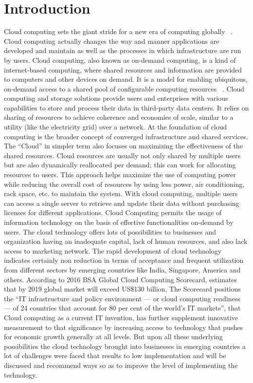 \documentclass[conference]{IEEEtran}
\begin{document}
\section{Introduction}
Cloud computing sets the giant stride for a new era of
computing globally ~\cite{1}. Cloud computing actually changes the
way and manner applications are developed and maintain as
well as the processes in which infrastructure are run by users.
Cloud computing, also known as on-demand computing, is a
kind of internet-based computing, where shared resources and
information are provided to computers and other devices on demand. It is a model for enabling ubiquitous, on-demand
access to a shared pool of configurable computing resources
~\cite{2}. Cloud computing and storage solutions provide users and
enterprises with various capabilities to store and process their
data in third-party data centers. It relies on sharing of resources
to achieve coherence and economies of scale, similar to a
utility (like the electricity grid) over a network. At the
foundation of cloud computing is the broader concept of
converged infrastructure and shared services. The “Cloud” in
simpler term also focuses on maximizing the effectiveness of
the shared resources. Cloud resources are usually not only
shared by multiple users but are also dynamically reallocated
per demand; this can work for allocating resources to users.
This approach helps maximize the use of computing power
while reducing the overall cost of resources by using less
power, air conditioning, rack space, etc. to maintain the
system. With cloud computing, multiple users can access a
single server to retrieve and update their data without
purchasing licenses for different applications. Cloud
Computing permits the usage of information technology on the
basis of effective functionalities on-demand by users. The
cloud technology offers lots of possibilities to businesses and
organization having an inadequate capital, lack of human
resources, and also lack access to marketing network.
The rapid development of cloud technology indicates certainly
non reduction in terms of acceptance and frequent utilization
from different sectors by emerging countries like India,
Singapore, America and others. According to 2016 BSA
Global Cloud Computing Scorecard, estimates that by 2019
global market will exceed US\$130 billion, The Scorecard
positions the “IT infrastructure and policy environment — or
cloud computing readiness — of 24 countries that account for
80 per cent of the world’s IT markets”, that Cloud computing
as a current IT invention, has further supplement innovative
measurement to that significance by increasing access to
technology that pushes for economic growth generally at all
levels.
But upon all these underlying possibilities the cloud
technology brought into businesses in emerging countries a lot
of challenges were faced that results to low implementation
and will be discussed and recommend ways so as to improve
the level of implementing the technology.
\\
\end{document}
